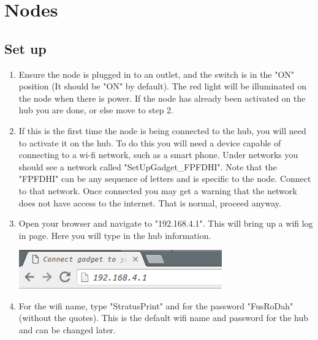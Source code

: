   \section{Nodes}
  \subsection{Set up}
    \begin{enumerate}
      \item Ensure the node is plugged in to an outlet, and the switch is in the "ON" position (It should be "ON" by default).
      The red light will be illuminated on the node when there is power. If the node
      has already been activated on the hub you are done, or else move to step 2.

      \item If this is the first time the node is being connected to the hub,
      you will need to activate it on the hub. To do this you will need a device
      capable of connecting to a wi-fi network, such as a smart phone. Under networks
      you should see a network called "SetUpGadget\_FPFDHI". Note that the "FPFDHI"
      can be any sequence of letters and is specific to the node. Connect to that network.
      Once connected you may get a warning that the network does not have access
      to the internet. That is normal, proceed anyway.

      \item Open your browser and navigate to "192.168.4.1". This will bring up
      a wifi log in page. Here you will type in the hub information.
      \begin{center}
      \includegraphics[scale=1]{images/ip-enter.png}
    \end{center}

      \item For the wifi name, type "StratusPrint" and for the password "FusRoDah" (without the quotes).
      This is the default wifi name and password for the hub and can be changed later.


\end{enumerate}
